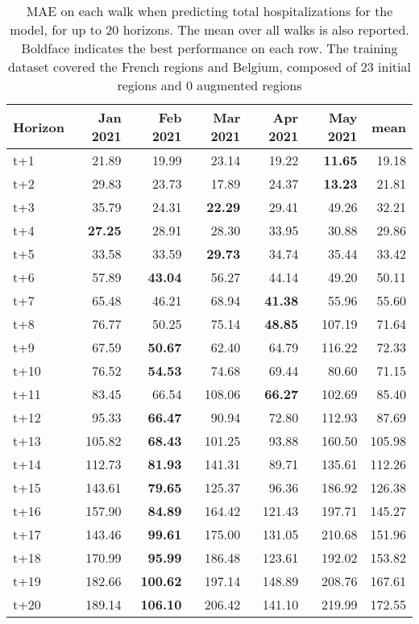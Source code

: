 \begin{table}[H]
\centering
\caption{MAE on each walk when predicting total hospitalizations for the model, for up to 20 horizons. The mean over all walks is also reported. Boldface indicates the best performance on each row. The training dataset covered the French regions and Belgium, composed of 23 initial regions and 0 augmented regions }
\label{tab:MAE_walk_dense_model}
\begin{tabular}{lrrrrrr}
\toprule
Horizon &  Jan 2021 &  Feb 2021 &  Mar 2021 &  Apr 2021 &  May 2021 &   mean \\
\midrule
t+1  & 21.89  & 19.99  & 23.14  & 19.22  & \textbf{11.65}  & 19.18  \\
t+2  & 29.83  & 23.73  & 17.89  & 24.37  & \textbf{13.23}  & 21.81  \\
t+3  & 35.79  & 24.31  & \textbf{22.29}  & 29.41  & 49.26  & 32.21  \\
t+4  & \textbf{27.25}  & 28.91  & 28.30  & 33.95  & 30.88  & 29.86  \\
t+5  & 33.58  & 33.59  & \textbf{29.73}  & 34.74  & 35.44  & 33.42  \\
t+6  & 57.89  & \textbf{43.04}  & 56.27  & 44.14  & 49.20  & 50.11  \\
t+7  & 65.48  & 46.21  & 68.94  & \textbf{41.38}  & 55.96  & 55.60  \\
t+8  & 76.77  & 50.25  & 75.14  & \textbf{48.85}  & 107.19  & 71.64  \\
t+9  & 67.59  & \textbf{50.67}  & 62.40  & 64.79  & 116.22  & 72.33  \\
t+10  & 76.52  & \textbf{54.53}  & 74.68  & 69.44  & 80.60  & 71.15  \\
t+11  & 83.45  & 66.54  & 108.06  & \textbf{66.27}  & 102.69  & 85.40  \\
t+12  & 95.33  & \textbf{66.47}  & 90.94  & 72.80  & 112.93  & 87.69  \\
t+13  & 105.82  & \textbf{68.43}  & 101.25  & 93.88  & 160.50  & 105.98  \\
t+14  & 112.73  & \textbf{81.93}  & 141.31  & 89.71  & 135.61  & 112.26  \\
t+15  & 143.61  & \textbf{79.65}  & 125.37  & 96.36  & 186.92  & 126.38  \\
t+16  & 157.90  & \textbf{84.89}  & 164.42  & 121.43  & 197.71  & 145.27  \\
t+17  & 143.46  & \textbf{99.61}  & 175.00  & 131.05  & 210.68  & 151.96  \\
t+18  & 170.99  & \textbf{95.99}  & 186.48  & 123.61  & 192.02  & 153.82  \\
t+19  & 182.66  & \textbf{100.62}  & 197.14  & 148.89  & 208.76  & 167.61  \\
t+20  & 189.14  & \textbf{106.10}  & 206.42  & 141.10  & 219.99  & 172.55  \\

\bottomrule
\end{tabular}
\end{table}
